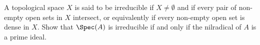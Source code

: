 \begin{exercise}
A topological space \(X\) is said to be irreducible if \(X \neq \emptyset\) and if every pair of non-empty open sets in \(X\) intersect, or equivalently if every non-empty open set is dense in \(X\).
Show that \(\Spec(A)\) is irreducible if and only if the nilradical of \(A\) is a prime ideal.
\end{exercise}

\begin{solution}

\end{solution}